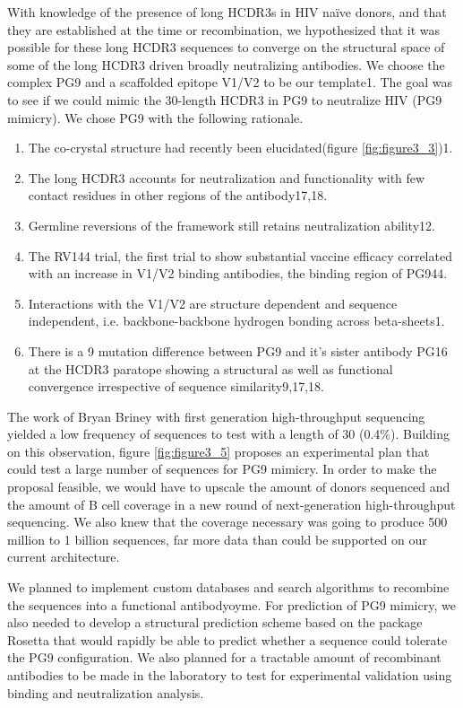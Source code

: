 With knowledge of the presence of long HCDR3s in HIV naïve donors, and that they are established at the time or recombination, we hypothesized that it was possible for these long HCDR3 sequences to converge on the structural space of some of the long HCDR3 driven broadly neutralizing antibodies. We choose the complex PG9 and a scaffolded epitope V1/V2 to be our template1. The goal was to see if we could mimic the 30-length HCDR3 in PG9 to neutralize HIV (PG9 mimicry). We chose PG9 with the following rationale.

\begin{enumerate}
    \item  The co-crystal structure had recently been elucidated(figure \ref{fig:figure3_3})1.
	\item  The long HCDR3 accounts for neutralization and functionality with few contact residues in other regions of the antibody17,18.
	\item  Germline reversions of the framework still retains neutralization ability12.
	\item  The RV144 trial, the first trial to show substantial vaccine efficacy correlated with an increase in V1/V2 binding antibodies, the binding region of PG944.
	\item  Interactions with the V1/V2 are structure dependent and sequence independent, i.e. backbone-backbone hydrogen bonding across beta-sheets1.
	\item  There is a 9 mutation difference between PG9 and it's sister antibody PG16 at the HCDR3 paratope showing a structural as well as functional convergence irrespective of sequence similarity9,17,18.
\end{enumerate}

The work of Bryan Briney with first generation high-throughput sequencing yielded a low frequency of sequences to test with a length of 30 (0.4\%). Building on this observation, figure \ref{fig:figure3_5} proposes an experimental plan that could test a large number of sequences for PG9 mimicry. In order to make the proposal feasible, we would have to upscale the amount of donors sequenced and the amount of B cell coverage in a new round of next-generation high-throughput sequencing.  We also knew that the coverage necessary was going to produce 500 million to 1 billion sequences, far more data than could be supported on our current architecture.

We planned to implement custom databases and search algorithms to recombine the sequences into a functional antibodyoyme. For prediction of PG9 mimicry, we also needed to develop a structural prediction scheme based on the package Rosetta that would rapidly be able to predict whether a sequence could tolerate the PG9 configuration. We also planned for a tractable amount of recombinant antibodies to be made in the laboratory to test for experimental validation using binding and neutralization analysis.

